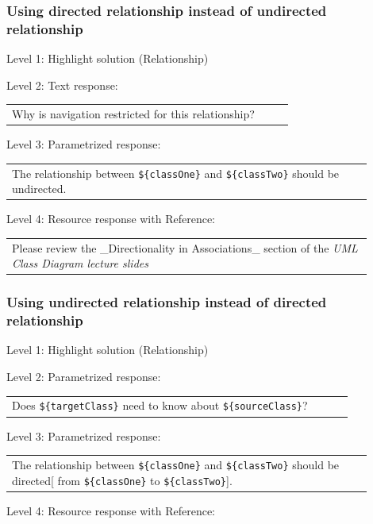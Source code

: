 \subsubsection{Using directed relationship instead of undirected relationship}

\noindent Level 1: Highlight solution (Relationship) \medskip

\noindent Level 2: Text response: \medskip

\begin{tabular}{|p{0.9\linewidth}}
Why is navigation restricted for this relationship?
\end{tabular} \medskip

\noindent Level 3: Parametrized response: \medskip

\begin{tabular}{|p{0.9\linewidth}}
The relationship between \verb|${classOne}| and \verb|${classTwo}| should be undirected.
\end{tabular} \medskip

\noindent Level 4: Resource response with Reference: \medskip

\begin{tabular}{|p{0.9\linewidth}}
Please review the _Directionality in Associations_ section of the \textit{UML Class Diagram lecture slides}
\end{tabular} \medskip


\subsubsection{Using undirected relationship instead of directed relationship}

\noindent Level 1: Highlight solution (Relationship) \medskip

\noindent Level 2: Parametrized response: \medskip

\begin{tabular}{|p{0.9\linewidth}}
Does \verb|${targetClass}| need to know about \verb|${sourceClass}|?
\end{tabular} \medskip

\noindent Level 3: Parametrized response: \medskip

\begin{tabular}{|p{0.9\linewidth}}
The relationship between \verb|${classOne}| and \verb|${classTwo}| should be directed[ from \verb|${classOne}| to \verb|${classTwo}|].
\end{tabular} \medskip

\noindent Level 4: Resource response with Reference: \medskip

